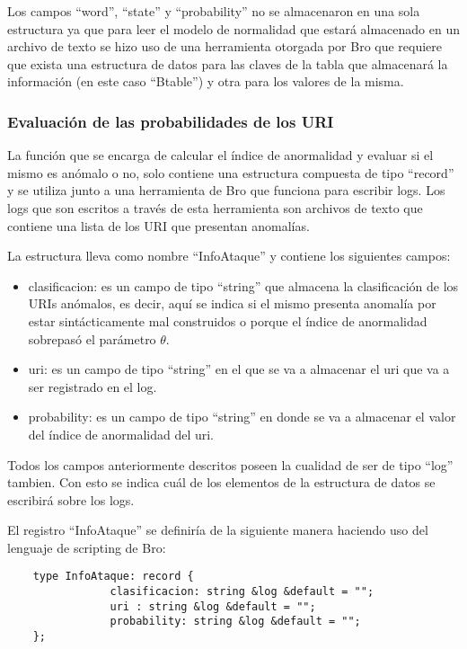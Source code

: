 Los campos “word”, “state” y “probability” no se almacenaron en una sola estructura ya que para leer el modelo de normalidad que estará almacenado en un archivo de texto se hizo uso de una herramienta otorgada por Bro que requiere que exista una estructura de datos  para las claves de la tabla que almacenará la información (en este caso “Btable”) y otra para los valores de la misma.

\subsubsection{Evaluación de las probabilidades de los URI}
\label{sssec:estructuraEvaluacion}

La función  que se encarga de calcular el índice de anormalidad  y evaluar si el mismo es anómalo o no, solo contiene una estructura compuesta de tipo “record” y se utiliza junto a una herramienta de Bro que funciona para escribir logs. Los logs que son escritos a través de esta herramienta son archivos de texto que contiene una lista de los URI que presentan anomalías.

La estructura lleva como nombre “InfoAtaque” y contiene los siguientes campos:

\begin{itemize}
\item clasificacion: es un campo de tipo “string” que almacena la clasificación de los URIs anómalos, es decir, aquí se indica si el mismo presenta anomalía por estar sintácticamente mal construidos o porque el índice de anormalidad sobrepasó el parámetro $\theta$.
\item uri: es un campo de tipo “string” en el que se va a almacenar el uri que va a ser registrado en el log.
\item probability: es un campo de tipo “string” en donde se va a almacenar el valor del índice de anormalidad del uri.
\end{itemize}

Todos los campos anteriormente descritos poseen la cualidad de ser de tipo “log” tambien. Con esto se indica cuál de los elementos de la estructura de datos se escribirá sobre los logs.

    El registro “InfoAtaque” se definiría de la siguiente manera haciendo uso del lenguaje de scripting de Bro:

\begin{verbatim}
    type InfoAtaque: record {
                clasificacion: string &log &default = "";
                uri : string &log &default = "";
                probability: string &log &default = "";
    }; 
\end{verbatim}

